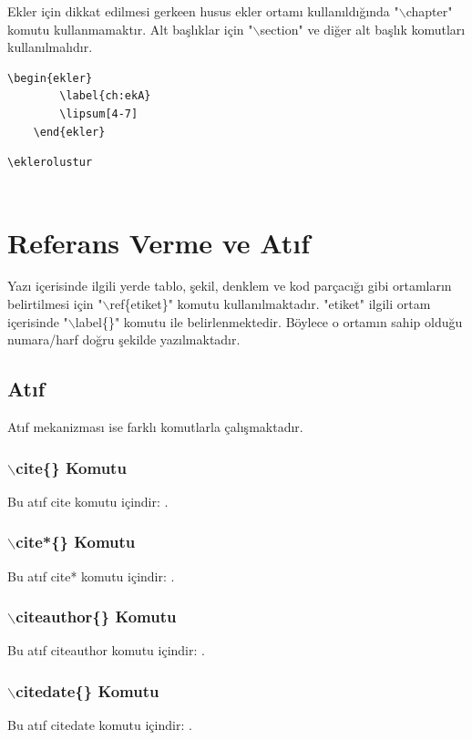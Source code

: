 Ekler için dikkat edilmesi gerkeen husus ekler ortamı kullanıldığında "$\backslash$chapter" komutu kullanmamaktır. Alt başlıklar için "$\backslash$section" ve diğer alt başlık komutları kullanılmalıdır.


\begin{lstlisting}[language={[LaTeX]{TeX}}, label=code:ekler, caption=Örnek ekler sayfası]
	\begin{ekler}
		\label{ch:ekA}
		\lipsum[4-7]
	\end{ekler}
\end{lstlisting}

\begin{lstlisting}[language={[LaTeX]{TeX}}, label=code:ekler2, caption=tez.tex içerisinde ekler bölümünün oluşturulması]
	\eklerolustur
	
\end{lstlisting}


\chapter{Referans Verme ve Atıf}
\label{ch:ref}
Yazı içerisinde ilgili yerde tablo, şekil, denklem ve kod parçacığı gibi ortamların belirtilmesi için "$\backslash$ref\{etiket\}" komutu kullanılmaktadır. "etiket" ilgili ortam içerisinde "$\backslash$label\{\}" komutu ile belirlenmektedir. Böylece o ortamın sahip olduğu numara/harf doğru şekilde yazılmaktadır. 

\section{Atıf}
Atıf mekanizması ise farklı komutlarla çalışmaktadır.

\subsection{$\backslash$cite\{\} Komutu}
Bu atıf cite komutu içindir: \cite{tekyazarArticle}.
\subsection{$\backslash$cite*\{\} Komutu}
Bu atıf cite* komutu içindir: \cite*{tekyazarArticle2}.
\subsection{$\backslash$citeauthor\{\} Komutu}
Bu atıf citeauthor komutu içindir: \citeauthor{tekyazarArticle}.
\subsection{$\backslash$citedate\{\} Komutu}
Bu atıf citedate komutu içindir: .
